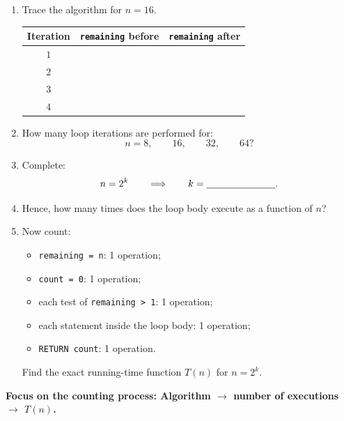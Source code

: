 \documentclass[11pt,a4paper]{article}
\begin{document}
\begin{enumerate}
    \item Trace the algorithm for $n=16$.

    \begin{center}
    \renewcommand{\arraystretch}{1.35}
    \begin{tabular}{c|c|c}
        \toprule
        Iteration & \texttt{remaining} before & \texttt{remaining} after \\
        \midrule
        $1$ & & \\
        $2$ & & \\
        $3$ & & \\
        $4$ & & \\
        \bottomrule
    \end{tabular}
    \end{center}

    \item How many loop iterations are performed for:
    \[
        n=8,\qquad16,\qquad32,\qquad64?
    \]

    \item Complete:
    \[
        n=2^k
        \qquad\Longrightarrow\qquad
        k=\underline{\hspace{2.5cm}}.
    \]

    \item Hence, how many times does the loop body execute as a function of $n$?

    \item Now count:
    \begin{itemize}
        \item \texttt{remaining = n}: 1 operation;
        \item \texttt{count = 0}: 1 operation;
        \item each test of \texttt{remaining > 1}: 1 operation;
        \item each statement inside the loop body: 1 operation;
        \item \texttt{RETURN count}: 1 operation.
    \end{itemize}

    Find the exact running-time function $T(n)$ for $n=2^k$.
\end{enumerate}

\vfill

\begin{center}
\color{ForestGreen}\bfseries
Focus on the counting process:
Algorithm $\rightarrow$ number of executions $\rightarrow$ $T(n)$.
\end{center}
\end{document}
